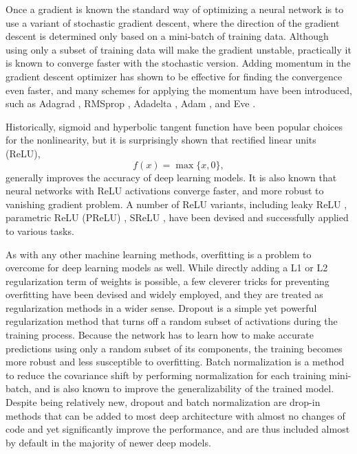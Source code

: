 Once a gradient is known the standard way of optimizing a neural network is to use a variant of stochastic gradient descent, where the direction of the gradient descent is determined only based on a mini-batch of training data.
Although using only a subset of training data will make the gradient unstable, practically it is known to converge faster with the stochastic version.
Adding momentum in the gradient descent optimizer has shown to be effective for finding the convergence even faster, and many schemes for applying the momentum have been introduced, such as Adagrad \cite{duchi2011adagrad}, RMSprop \cite{hinton2012rmsprop}, Adadelta \cite{zeiler2012adadelta}, Adam \cite{kingma2014adam}, and Eve \cite{koushik2016eve}.

Historically, sigmoid and hyperbolic tangent function have been popular choices for the nonlinearity, but it is surprisingly shown \cite{nair2010relu} that rectified linear units (ReLU),
\begin{equation}
	f(x) = \max \{ x, 0 \},
\end{equation}
generally improves the accuracy of deep learning models.
It is also known that neural networks with ReLU activations converge faster, and more robust to vanishing gradient problem.
A number of ReLU variants, including leaky ReLU \cite{xu2015leakyrelu}, parametric ReLU (PReLU) \cite{he2015prelu}, SReLU \cite{jin2015srelu}, have been devised and successfully applied to various tasks.

As with any other machine learning methods, overfitting is a problem to overcome for deep learning models as well.
While directly adding a L1 or L2 regularization term of weights is possible, a few cleverer tricks for preventing overfitting have been devised and widely employed, and they are treated as regularization methods in a wider sense.
Dropout \cite{srivastava2014dropout} is a simple yet powerful regularization method that turns off a random subset of activations during the training process.
Because the network has to learn how to make accurate predictions using only a random subset of its components, the training becomes more robust and less susceptible to overfitting.
Batch normalization \cite{ioffe2015batchnorm} is a method to reduce the covariance shift by performing normalization for each training mini-batch, and is also known to improve the generalizability of the trained model.
Despite being relatively new, dropout and batch normalization are drop-in methods that can be added to most deep architecture with almost no changes of code and yet significantly improve the performance, and are thus included almost by default in the majority of newer deep models.

